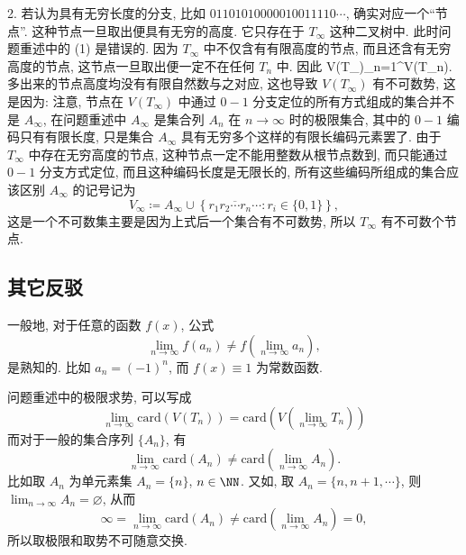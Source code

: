 {}

2. 若认为具有无穷长度的分支, 比如 $01101010000010011110\cdots$, 确实对应一个``节点''. 这种节点一旦取出便具有无穷的高度. 它只存在于 $T_{\infty}$ 这种二叉树中.
\bm{}{}
此时问题重述中的 (1) 是错误的. 
因为 $T_{\infty}$ 中不仅含有有限高度的节点, 而且还含有无穷高度的节点, 这节点一旦取出便一定不在任何 $T_n$ 中. 因此
\bee
V(T_{\infty})\setminus\bigcup_{n=1}^{\infty}V(T_n)\ne\varnothing.
\eee
多出来的节点高度均没有有限自然数与之对应, 这也导致 $V(T_{\infty})$ 有不可数势, 这是因为:
\bm{}{}
注意, 节点在 $V(T_{\infty})$ 中通过 $0-1$ 分支定位的所有方式组成的集合并不是 $A_{\infty}$, 在问题重述中 $A_{\infty}$ 是集合列 $A_n$ 在 $n\to\infty$ 时的极限集合, 其中的 $0-1$ 编码只有有限长度, 只是集合 $A_{\infty}$ 具有无穷多个这样的有限长编码元素罢了. 由于 $T_{\infty}$ 中存在无穷高度的节点, 这种节点一定不能用整数从根节点数到, 而只能通过 $0-1$ 分支方式定位, 而且这种编码长度是无限长的, 所有这些编码所组成的集合应该区别 $A_{\infty}$ 的记号记为
\[V_{\infty}\coloneqq A_{\infty}\cup\left\{\overline{r_1r_2\cdots r_n\cdots}: r_i\in\{0,1\}\right\},\]
这是一个不可数集主要是因为上式后一个集合有不可数势, 所以 $T_{\infty}$ 有不可数个节点.
\em
\em

\subsection{其它反驳}
一般地, 对于任意的函数 $f(x)$, 公式
\[\lim_{n\to\infty}f(a_n)\ne f\left(\lim_{n\to\infty}a_n\right),\]
是熟知的. 比如 $a_n=(-1)^n$, 而 $f(x)\equiv 1$ 为常数函数.

问题重述中的极限求势, 可以写成
\[\lim_{n\to\infty}\mathrm{card}(V(T_n))=\mathrm{card}\left(V(\lim_{n\to\infty }T_n)\right)\]
而对于一般的集合序列 $\{A_n\}$, 有
\[\lim_{n\to\infty}\mathrm{card}(A_n)\ne\mathrm{card}\left(\lim_{n\to\infty}A_n\right).\]
比如取 $A_n$ 为单元素集 $A_n=\{n\}$, $n\in\NN$. 
又如, 取 $A_n=\{n,n+1,\cdots\}$, 则 $\lim_{n\to \infty}A_n=\varnothing$, 从而
\[\infty=\lim_{n\to\infty}\mathrm{card}(A_n)\ne\mathrm{card}\left(\lim_{n\to\infty}A_n\right)=0,\]
所以取极限和取势不可随意交换.